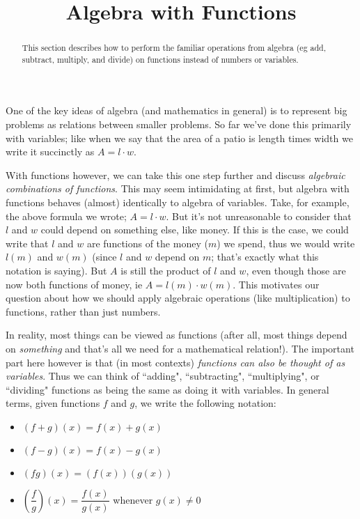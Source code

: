 \documentclass{ximera}
\title{Algebra with Functions}
\begin{document}
\begin{abstract}
    This section describes how to perform the familiar operations from algebra (eg add, subtract, multiply, and divide) on functions instead of numbers or variables.
\end{abstract}
\maketitle

    One of the key ideas of algebra (and mathematics in general) is to represent big problems as relations between smaller problems. So far we've done this primarily with variables; like when we say that the area of a patio is length times width we write it succinctly as $A = l\cdot w$.
    
    With functions however, we can take this one step further and discuss \textit{algebraic combinations of functions}. This may seem intimidating at first, but algebra with functions behaves (almost) identically to algebra of variables. Take, for example, the above formula we wrote; $A = l\cdot w$. But it's not unreasonable to consider that $l$ and $w$ could depend on something else, like money. If this is the case, we could write that $l$ and $w$ are functions of the money ($m$) we spend, thus we would write $l(m)$ and $w(m)$ (since $l$ and $w$ depend on $m$; that's exactly what this notation is saying). But $A$ is still the product of $l$ and $w$, even though those are now both functions of money, ie $A = l(m) \cdot w(m)$. This motivates our question about how we should apply algebraic operations (like multiplication) to functions, rather than just numbers.
    
    In reality, most things can be viewed as functions (after all, most things depend on \textit{something} and that's all we need for a mathematical relation!). The important part here however is that (in most contexts) \textit{functions can also be thought of as variables}. Thus we can think of ``adding", ``subtracting", ``multiplying", or ``dividing" functions as being the same as doing it with variables. In general terms, given functions $f$ and $g$, we write the following notation:
    
    \begin{itemize}
        \item $(f + g)(x)  = f(x) + g(x)$
        \item $(f - g)(x) = f(x) - g(x)$
        \item $(fg)(x) = (f(x))(g(x))$
        \item $\left(\dfrac{f}{g}\right)(x) = \dfrac{f(x)}{g(x)}$ whenever $g(x) \neq 0$
    \end{itemize}
    
\end{document}
